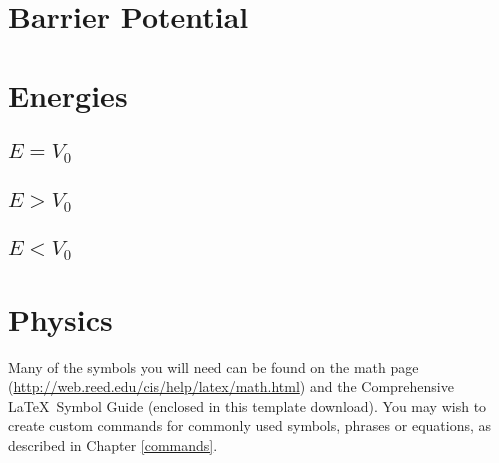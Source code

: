 \section{Barrier Potential}

\section{Energies}
    \subsection{$E = V_0$}
    \subsection{$E > V_0$}
    \subsection{$E < V_0$}
    
    
    
    
\section{Physics}

Many of the symbols you will need can be found on the math page (\url{http://web.reed.edu/cis/help/latex/math.html}) and the Comprehensive \LaTeX\ Symbol Guide (enclosed in this template download).  You may wish to create custom commands for commonly used symbols, phrases or equations, as described in Chapter \ref{commands}.
